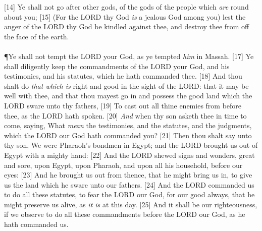 [14] \textcolor[rgb]{0.00,0.00,1.00}{Ye shall not go after other gods, of the gods of the people which \emph{are} round about you;}
[15] \textcolor[rgb]{0.00,0.00,1.00}{(For the LORD thy God \emph{is} a jealous God among you) lest the anger of the LORD thy God be kindled against thee, and destroy thee from off the face of the earth.}\\
\\
\P \textcolor[rgb]{0.00,0.00,1.00}{Ye shall not tempt the LORD your God, as ye tempted \emph{him} in Massah.}
[17] \textcolor[rgb]{0.00,0.00,1.00}{Ye shall diligently keep the commandments of the LORD your God, and his testimonies, and his statutes, which he hath commanded thee.}
[18] \textcolor[rgb]{0.00,0.00,1.00}{And thou shalt do \emph{that which is} right and good in the sight of the LORD: that it may be well with thee, and that thou mayest go in and possess the good land which the LORD sware unto thy fathers,}
[19] \textcolor[rgb]{0.00,0.00,1.00}{To cast out all thine enemies from before thee, as the LORD hath spoken.}
[20] \textcolor[rgb]{0.00,0.00,1.00}{\emph{And} when thy son asketh thee in time to come, saying, What \emph{mean} the testimonies, and the statutes, and the judgments, which the LORD our God hath commanded you?}
[21] \textcolor[rgb]{0.00,0.00,1.00}{Then thou shalt say unto thy son, We were Pharaoh's bondmen in Egypt; and the LORD brought us out of Egypt with a mighty hand:}
[22] \textcolor[rgb]{0.00,0.00,1.00}{And the LORD shewed signs and wonders, great and sore, upon Egypt, upon Pharaoh, and upon all his household, before our eyes:}
[23] \textcolor[rgb]{0.00,0.00,1.00}{And he brought us out from thence, that he might bring us in, to give us the land which he sware unto our fathers.}
[24] \textcolor[rgb]{0.00,0.00,1.00}{And the LORD commanded us to do all these statutes, to fear the LORD our God, for our good always, that he might preserve us alive, as \emph{it is} at this day.}
[25] \textcolor[rgb]{0.00,0.00,1.00}{And it shall be our righteousness, if we observe to do all these commandments before the LORD our God, as he hath commanded us.}
\newpage
